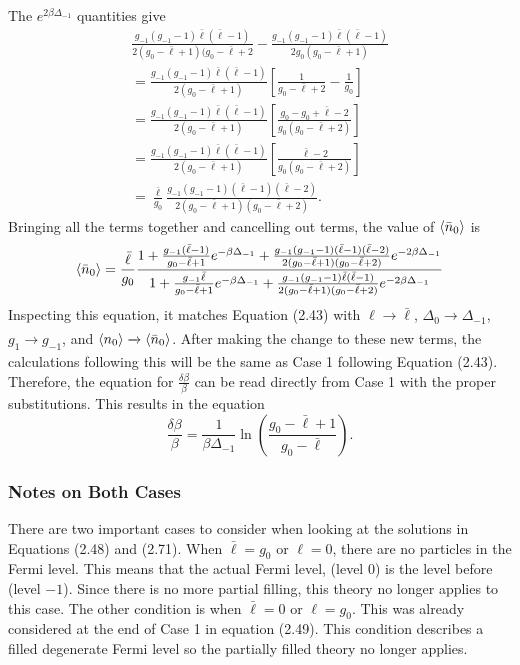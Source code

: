 The $e^{2\beta\Delta_{-1}}$ quantities give
\begin{gather}
    \frac{g_{-1}(g_{-1}-1)\bar{\ell}(\bar{\ell}-1)}{2(g_0-\bar{\ell}+1)(g_0-\bar{\ell}+2}-\frac{g_{-1}(g_{-1}-1)\bar{\ell}(\bar{\ell}-1)}{2g_0(g_0-\bar{\ell}+1)}\nonumber\\
    =\frac{g_{-1}(g_{-1}-1)\bar{\ell}(\bar{\ell}-1)}{2(g_0-\bar{\ell}+1)}[\frac{1}{g_0-\bar{\ell}+2}-\frac{1}{g_0}]\nonumber\\
    =\frac{g_{-1}(g_{-1}-1)\bar{\ell}(\bar{\ell}-1)}{2(g_0-\bar{\ell}+1)}[\frac{g_0-g_0+\bar{\ell}-2}{g_0(g_0-\bar{\ell}+2)}]\nonumber\\
    =\frac{g_{-1}(g_{-1}-1)\bar{\ell}(\bar{\ell}-1)}{2(g_0-\bar{\ell}+1)}[\frac{\bar{\ell}-2}{g_0(g_0-\bar{\ell}+2)}]\nonumber\\
    =\frac{\bar{\ell}}{g_0}\frac{g_{-1}(g_{-1}-1)(\bar{\ell}-1)(\bar{\ell}-2)}{2(g_0-\bar{\ell}+1)(g_0-\bar{\ell}+2)}.
\end{gather}
Bringing all the terms together and cancelling out terms, the value of $\left<{\bar{n}_0}\right>$ is 
\begin{equation}
    \left<{\bar{n}_0}\right>=\frac{\bar{\ell}}{g_0}\frac{1+\frac{g_{-1}(\bar{\ell}-1)}{g_0-\bar{\ell}+1}e^{-\beta\Delta_{-1}}+\frac{g_{-1}(g_{-1}-1)(\bar{\ell}-1)(\bar{\ell}-2)}{2(g_0-\bar{\ell}+1)(g_0-\bar{\ell}+2)}e^{-2\beta\Delta_{-1}}}{1+\frac{g_{-1}\bar{\ell}}{g_0-\bar{\ell}+1}e^{-\beta\Delta_{-1}}+\frac{g_{-1}(g_{-1}-1)\bar{\ell}(\bar{\ell}-1)}{2(g_0-\bar{\ell}+1)(g_0-\bar{\ell}+2)}e^{-2\beta\Delta_{-1}}}
\end{equation}
Inspecting this equation, it matches Equation (2.43) with $\ell\xrightarrow[]{}\bar{\ell}$, $\Delta_0\xrightarrow[]{}\Delta_{-1}$, $g_1\xrightarrow[]{}g_{-1}$, and $\left<{n_0}\right>\xrightarrow[]{}\left<{\bar{n}_0}\right>$. After making the change to these new terms, the calculations following this will be the same as Case 1 following Equation (2.43). Therefore, the equation for $\frac{\delta\beta}{\beta}$ can be read directly from Case 1 with the proper substitutions. This results in the equation 
\begin{equation}
    \frac{\delta\beta}{\beta}=\frac{1}{\beta\Delta_{-1}}\ln(\frac{g_0-\bar{\ell}+1}{g_0-\bar{\ell}}).
\end{equation}
\subsubsection{Notes on Both Cases}
There are two important cases to consider when looking at the solutions in Equations (2.48) and (2.71). When $\bar{\ell}=g_0$ or $\ell=0$, there are no particles in the Fermi level. This means that the actual Fermi level, (level $0$) is the level before (level $-1$). Since there is no more partial filling, this theory no longer applies to this case. The other condition is when $\bar{\ell}=0$ or $\ell=g_0$. This was already considered at the end of Case 1 in equation (2.49). This condition describes a filled degenerate Fermi level so the partially filled theory no longer applies. 
